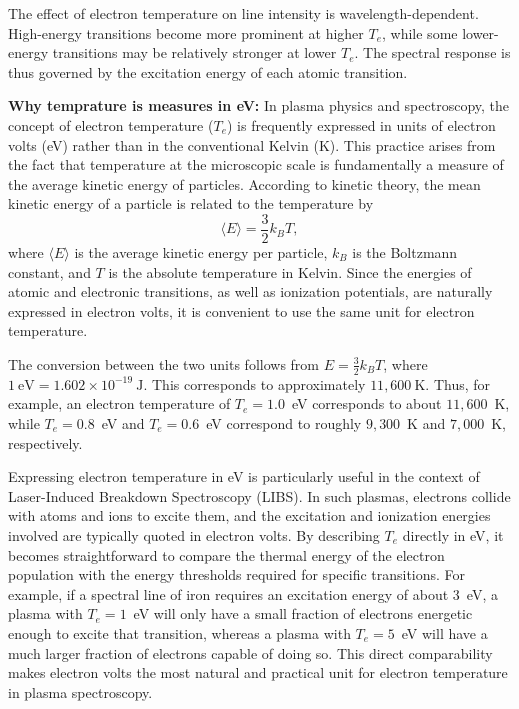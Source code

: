 \documentclass[12pt,a4paper]{article}
\begin{document}
	The effect of electron temperature on line intensity is wavelength-dependent. High-energy transitions become more prominent at higher $T_e$, while some lower-energy transitions may be relatively stronger at lower $T_e$. The spectral response is thus governed by the excitation energy of each atomic transition.
	
	
	\textbf{Why temprature is measures in eV:}
	In plasma physics and spectroscopy, the concept of electron temperature ($T_e$) is frequently expressed in units of electron volts (eV) rather than in the conventional Kelvin (K). This practice arises from the fact that temperature at the microscopic scale is fundamentally a measure of the average kinetic energy of particles. According to kinetic theory, the mean kinetic energy of a particle is related to the temperature by  
	\[
	\langle E \rangle = \frac{3}{2} k_B T,
	\]  
	where $\langle E \rangle$ is the average kinetic energy per particle, $k_B$ is the Boltzmann constant, and $T$ is the absolute temperature in Kelvin. Since the energies of atomic and electronic transitions, as well as ionization potentials, are naturally expressed in electron volts, it is convenient to use the same unit for electron temperature.  
	
	The conversion between the two units follows from $E = \frac{3}{2}k_B T$, where $1~\text{eV} = 1.602 \times 10^{-19}~\text{J}$. This corresponds to approximately $11{,}600~\text{K}$. Thus, for example, an electron temperature of $T_e = 1.0$~eV corresponds to about $11{,}600$~K, while $T_e = 0.8$~eV and $T_e = 0.6$~eV correspond to roughly $9{,}300$~K and $7{,}000$~K, respectively.  
	
	Expressing electron temperature in eV is particularly useful in the context of Laser-Induced Breakdown Spectroscopy (LIBS). In such plasmas, electrons collide with atoms and ions to excite them, and the excitation and ionization energies involved are typically quoted in electron volts. By describing $T_e$ directly in eV, it becomes straightforward to compare the thermal energy of the electron population with the energy thresholds required for specific transitions. For example, if a spectral line of iron requires an excitation energy of about 3~eV, a plasma with $T_e = 1$~eV will only have a small fraction of electrons energetic enough to excite that transition, whereas a plasma with $T_e = 5$~eV will have a much larger fraction of electrons capable of doing so. This direct comparability makes electron volts the most natural and practical unit for electron temperature in plasma spectroscopy.
	
\end{document}
